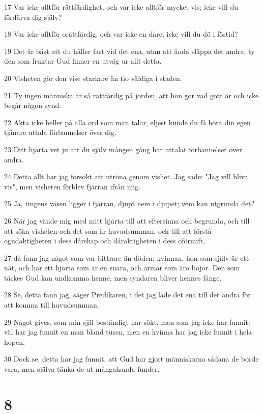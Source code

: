 \par 17 Var icke alltför rättfärdighet, och var icke alltför mycket vis; icke vill du fördärva dig själv?
\par 18 Var icke alltför orättfärdig, och var icke en dåre; icke vill du dö i förtid?
\par 19 Det är bäst att du håller fast vid det ena, utan att ändå släppa det andra; ty den som fruktar Gud finner en utväg ur allt detta.
\par 20 Visheten gör den vise starkare än tio väldiga i staden.
\par 21 Ty ingen människa är så rättfärdig på jorden, att hon gör vad gott är och icke begår någon synd.
\par 22 Akta icke heller på alla ord som man talar, eljest kunde du få höra din egen tjänare uttala förbannelser över dig.
\par 23 Ditt hjärta vet ju att du själv mången gång har uttalat förbannelser över andra.
\par 24 Detta allt har jag försökt att utröna genom vishet. Jag sade: "Jag vill bliva vis", men visheten förblev fjärran ifrån mig.
\par 25 Ja, tingens väsen ligger i fjärran, djupt nere i djupet; vem kan utgrunda det?
\par 26 När jag vände mig med mitt hjärta till att eftersinna och begrunda, och till att söka visheten och det som är huvudsumman, och till att förstå ogudaktigheten i dess dårskap och dåraktigheten i dess oförnuft,
\par 27 då fann jag något som var bittrare än döden: kvinnan, hon som själv är ett nät, och har ett hjärta som är en snara, och armar som äro bojor. Den som täckes Gud kan undkomma henne, men syndaren bliver hennes fånge.
\par 28 Se, detta fann jag, säger Predikaren, i det jag lade det ena till det andra för att komma till huvudsumman.
\par 29 Något gives, som min själ beständigt har sökt, men som jag icke har funnit: väl har jag funnit en man bland tusen, men en kvinna har jag icke funnit i hela hopen.
\par 30 Dock se, detta har jag funnit, att Gud har gjort människorna sådana de borde vara, men själva tänka de ut mångahanda funder.

\chapter{8}

